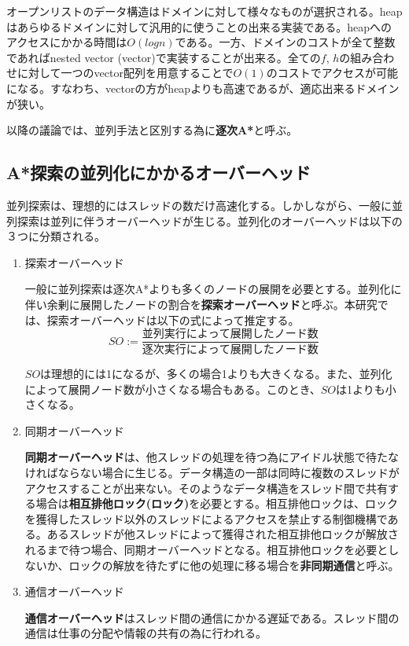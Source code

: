 \documentclass[uplatex]{jsarticle}
\begin{document}
オープンリストのデータ構造はドメインに対して様々なものが選択される。heapはあらゆるドメインに対して汎用的に使うことの出来る実装である。heapへのアクセスにかかる時間は$O(logn)$である。一方、ドメインのコストが全て整数であればnested vector (vector)で実装することが出来る。全ての$f$, $h$の組み合わせに対して一つのvector配列を用意することで$O(1)$のコストでアクセスが可能になる。すなわち、vectorの方がheapよりも高速であるが、適応出来るドメインが狭い。
\newline

以降の議論では、並列手法と区別する為に\textbf{逐次A*}と呼ぶ。


\subsection{A*探索の並列化にかかるオーバーヘッド}

並列探索は、理想的にはスレッドの数だけ高速化する。しかしながら、一般に並列探索は並列に伴うオーバーヘッドが生じる。並列化のオーバーヘッドは以下の３つに分類される。

\begin{enumerate}
\item 探索オーバーヘッド
\newline

一般に並列探索は逐次A*よりも多くのノードの展開を必要とする。並列化に伴い余剰に展開したノードの割合を\textbf{探索オーバーヘッド}と呼ぶ。本研究では、探索オーバーヘッドは以下の式によって推定する。
\newline
\begin{equation}
	SO := \frac{並列実行によって展開したノード数}{逐次実行によって展開したノード数}
\end{equation}


$SO$は理想的には1になるが、多くの場合1よりも大きくなる。また、並列化によって展開ノード数が小さくなる場合もある。このとき、$SO$は1よりも小さくなる。
\newline

\item 同期オーバーヘッド
\newline

\textbf{同期オーバーヘッド}は、他スレッドの処理を待つ為にアイドル状態で待たなければならない場合に生じる。データ構造の一部は同時に複数のスレッドがアクセスすることが出来ない。そのようなデータ構造をスレッド間で共有する場合は\textbf{相互排他ロック(ロック)}を必要とする。相互排他ロックは、ロックを獲得したスレッド以外のスレッドによるアクセスを禁止する制御機構である。あるスレッドが他スレッドによって獲得された相互排他ロックが解放されるまで待つ場合、同期オーバーヘッドとなる。相互排他ロックを必要としないか、ロックの解放を待たずに他の処理に移る場合を\textbf{非同期通信}と呼ぶ。
\newline

\item 通信オーバーヘッド
\newline

\textbf{通信オーバーヘッド}はスレッド間の通信にかかる遅延である。スレッド間の通信は仕事の分配や情報の共有の為に行われる。

\end{enumerate}
\end{document}
